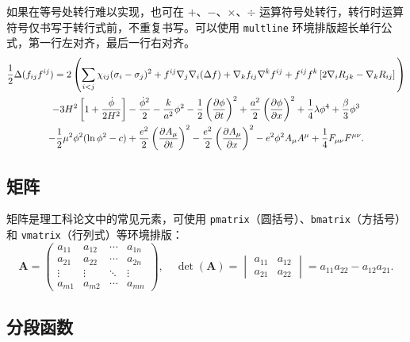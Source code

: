 如果在等号处转行难以实现，也可在 $+$、$-$、$\times$、$\div$ 运算符号处转行，转行时运算符号仅书写于转行式前，不重复书写。可以使用 \texttt{multline} 环境排版超长单行公式，第一行左对齐，最后一行右对齐。
\begin{multline}
  \frac{1}{2} \Delta (f_{ij} f^{ij}) =
  2 \left(\sum_{i<j} \chi_{ij}(\sigma_{i} - \sigma_{j})^{2}
  + f^{ij} \nabla_{j} \nabla_{i} (\Delta f)  + \nabla_{k} f_{ij} \nabla^{k} f^{ij} +
  f^{ij} f^{k} \left[2\nabla_{i}R_{jk}- \nabla_{k} R_{ij} \right] \vphantom{\sum_{i<j}} \right) \\
  - 3H^{2}\left[1+\frac{\dot{\phi}}{2H^2}\right] - \frac{\dot{\phi}^{2}}{2} - \frac{k}{a^{2}}\phi^{2} - \frac{1}{2}\left(\frac{\partial\phi}{\partial t}\right)^{2} + \frac{a^2}{2}\left(\frac{\partial\phi}{\partial x}\right)^{2}
  + \frac{1}{4}\lambda\phi^{4} + \frac{\beta}{3}\phi^{3} \\
  -\frac{1}{2}\mu^{2}\phi^{2}(\ln{\phi^{2}} - c)
  + \frac{e^{2}}{2}\left(\frac{\partial A_{\mu}}{\partial t}\right)^{2} - \frac{e^{2}}{2}\left(\frac{\partial A_{\mu}}{\partial x}\right)^{2}
  - e^{2}\phi^{2}A_{\mu}A^{\mu} + \frac{1}{4}F_{\mu\nu}F^{\mu\nu}.
\end{multline}

\subsection{矩阵}

矩阵是理工科论文中的常见元素，可使用 \texttt{pmatrix}（圆括号）、\texttt{bmatrix}（方括号）和 \texttt{vmatrix}（行列式）等环境排版：
\begin{equation}
  \mathbf{A} = \begin{pmatrix}
    a_{11} & a_{12} & \cdots & a_{1n} \\
    a_{21} & a_{22} & \cdots & a_{2n} \\
    \vdots & \vdots & \ddots & \vdots \\
    a_{m1} & a_{m2} & \cdots & a_{mn}
  \end{pmatrix}, \quad
  \det(\mathbf{A}) = \begin{vmatrix}
    a_{11} & a_{12} \\
    a_{21} & a_{22}
  \end{vmatrix} = a_{11}a_{22} - a_{12}a_{21}.
\end{equation}

\subsection{分段函数}

